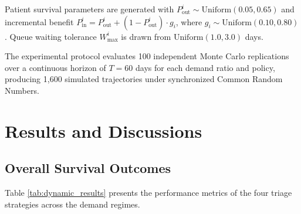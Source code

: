 \documentclass{ro}
\begin{document}
Patient survival parameters are generated with $P_{\text{out}}^i \sim \text{Uniform}(0.05, 0.65)$ and incremental benefit $P_{\text{in}}^i = P_{\text{out}}^i + (1 - P_{\text{out}}^i) \cdot g_i$, where $g_i \sim \text{Uniform}(0.10, 0.80)$. Queue waiting tolerance $W_{\max}^i$ is drawn from $\text{Uniform}(1.0, 3.0)$ days.

The experimental protocol evaluates 100 independent Monte Carlo replications over a continuous horizon of $T = 60$ days for each demand ratio and policy, producing 1,600 simulated trajectories under synchronized Common Random Numbers.

\section{Results and Discussions}
\label{sec:results}

\subsection{Overall Survival Outcomes}

Table \ref{tab:dynamic_results} presents the performance metrics of the four triage strategies across the demand regimes. 
\end{document}
